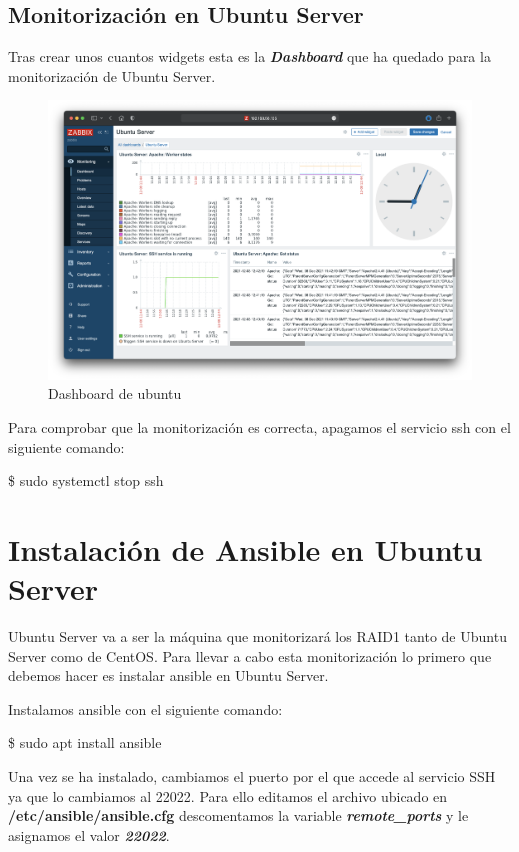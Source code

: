 \subsection{Monitorización en Ubuntu Server}
Tras crear unos cuantos widgets esta es la \textbf{\emph{Dashboard}} que ha quedado para la monitorización de Ubuntu Server.
    \begin{figure}[H]
        \centering
        \includegraphics[scale=0.25]{images/ubuntu_dashboard.png}
        \caption{Dashboard de ubuntu}
        \label{fig:ubuntu_dashboard}
    \end{figure}
Para comprobar que la monitorización es correcta, apagamos el servicio ssh con el siguiente comando:
\begin{tcolorbox}[colback=black!10, halign=left]
    \$ sudo systemctl stop ssh
\end{tcolorbox}

\section{Instalación de Ansible en Ubuntu Server}
Ubuntu Server va a ser la máquina que monitorizará los RAID1 tanto de Ubuntu Server como de CentOS. Para llevar a cabo esta monitorización lo primero que debemos hacer es instalar ansible en Ubuntu Server.

Instalamos ansible con el siguiente comando:
\begin{tcolorbox}[colback=black!10, halign=left]
    \$ sudo apt install ansible
\end{tcolorbox}
Una vez se ha instalado, cambiamos el puerto por el que accede al servicio SSH ya que lo cambiamos al 22022. Para ello editamos el archivo ubicado en \textbf{/etc/ansible/ansible.cfg} descomentamos la variable \textbf{\emph{remote\_ports}} y le asignamos el valor \textbf{\emph{22022}}.

